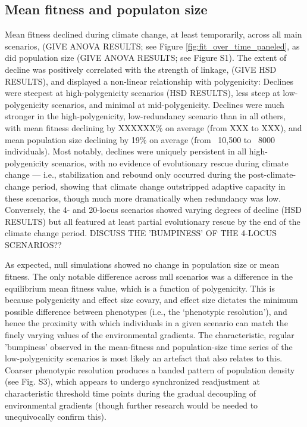 \documentclass[9pt,twocolumn,twoside,lineno]{pnas-new}
\begin{document}
\subsection*{Mean fitness and populaton size}
Mean fitness declined during climate change, at least temporarily, across all main scenarios, (GIVE ANOVA 
RESULTS; see Figure \ref{fig:fit_over_time_paneled}, as did population size (GIVE ANOVA 
RESULTS; see Figure S1). The extent of decline was 
positively correlated with the strength of linkage, (GIVE HSD RESULTS), and 
displayed a non-linear relationship with polygenicity:
Declines were steepest at high-polygenicity
scenarios (HSD RESULTS), less steep at low-polygenicity scenarios, and minimal at
mid-polygenicity. 
Declines were much stronger in the high-polygenicity, low-redundancy scenario
than in all others, with mean fitness
declining by XXXXXX\% on average (from XXX to XXX),
and mean population size declining by 19\% on average (from ~10,500 to ~8000 individuals).
Most notably, declines were uniquely persistent in all high-polygenicity scenarios,
with no evidence of evolutionary rescue during climate change --- i.e., stabilization and rebound only occurred during the post-climate-change period,  showing that climate change outstripped adaptive capacity in these scenarios,
though much more dramatically when redundancy was low.
Conversely, the 4- and 20-locus scenarios showed varying degrees
of decline (HSD RESULTS) but all featured at least partial evolutionary rescue by the end of the climate change period.
 DISCUSS THE 'BUMPINESS' OF THE 4-LOCUS SCENARIOS?? 

As expected, null simulations showed no change in population size or mean fitness.
The only notable difference across null scenarios was a difference in the 
equilibrium mean fitness value, which is a function of polygenicity. This is because polygenicity 
and effect size covary, and effect size dictates the minimum possible difference between phenotypes
(i.e., the `phenotypic resolution'), and hence the proximity with which individuals in a given scenario can 
match the finely varying values of the environmental gradients.
The characteristic, regular 'bumpiness' observed in the mean-fitness and population-size
time series of the low-polygenicity scenarios is most likely an artefact that also relates to this.
Coarser phenotypic resolution produces a banded pattern of population density
(see Fig. S3), which appears to undergo synchronized readjustment
at characteristic threshold time points during the gradual decoupling
of environmental gradients
(though further research would be needed to unequivocally confirm this).
\end{document}
